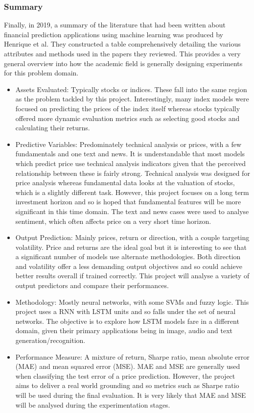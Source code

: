 \documentclass[10pt,onecolumn,letterpaper]{article}
\begin{document}
\subsubsection{Summary}

Finally, in 2019, a summary of the literature\cite{Henrique} that had been written about financial prediction applications using machine learning was produced by Henrique et al. They constructed a table comprehensively detailing the various attributes and methods used in the papers they reviewed. This provides a very general overview into how the academic field is generally designing experiments for this problem domain.

\begin{itemize}
	\item Assets Evaluated: Typically stocks or indices. These fall into the same region as the problem tackled by this project. Interestingly, many index models were focused on predicting the prices of the index itself whereas stocks typically offered more dynamic evaluation metrics such as selecting good stocks and calculating their returns.
	\item Predictive Variables: Predominately technical analysis or prices, with a few fundamentals and one text and news. It is understandable that most models which predict price use technical analysis indicators given that the perceived relationship between these is fairly strong. Technical analysis was designed for price analysis whereas fundamental data looks at the valuation of stocks, which is a slightly different task. However, this project focuses on a long term investment horizon and so is hoped that fundamental features will be more significant in this time domain. The text and news cases were used to analyse sentiment, which often affects price on a very short time horizon.
	\item Output Prediction: Mainly prices, return or direction, with a couple targeting volatility. Price and returns are the ideal goal but it is interesting to see that a significant number of models use alternate methodologies. Both direction and volatility offer a less demanding output objectives and so could achieve better results overall if trained correctly. This project will analyse a variety of output predictors and compare their performances.
	\item Methodology: Mostly neural networks, with some SVMs and fuzzy logic. This project uses a RNN with LSTM units and so falls under the set of neural networks. The objective is to explore how LSTM models fare in a different domain, given their primary applications being in image, audio and text generation/recognition.
	\item Performance Measure: A mixture of return, Sharpe ratio, mean absolute error (MAE) and mean squared error (MSE). MAE and MSE are generally used when classifying the test error of a price prediction. However, the project aims to deliver a real world grounding and so metrics such as Sharpe ratio will be used during the final evaluation. It is very likely that MAE and MSE will be analysed during the experimentation stages. 
\end{itemize}
\end{document}
